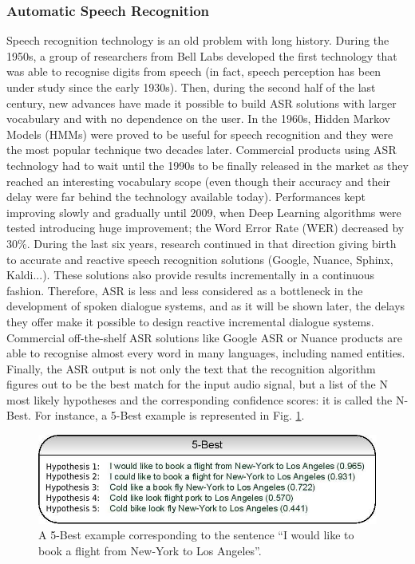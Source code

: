                       \subsubsection{Automatic Speech Recognition}

                      Speech recognition technology is an old problem with long history. During the 1950s, a group of researchers from Bell Labs developed the first technology that was able to recognise digits from speech (in fact, speech perception has been under study since the early 1930s). Then, during the second half of the last century, new advances have made it possible to build ASR solutions with larger vocabulary and with no dependence on the user. In the 1960s, Hidden Markov Models (HMMs) were proved to be useful for speech recognition \cite{Gales2007} and they were the most popular technique two decades later. Commercial products using ASR technology had to wait until the 1990s to be finally released in the market as they reached an interesting vocabulary scope (even though their accuracy and their delay were far behind the technology available today). Performances kept improving slowly and gradually until 2009, when Deep Learning algorithms were tested \cite{Mohamed2009,Deng2013} introducing huge improvement; the Word Error Rate (WER) decreased by 30\%. During the last six years, research continued in that direction giving birth to accurate and reactive speech recognition solutions (Google, Nuance, Sphinx, Kaldi...). These solutions also provide results incrementally in a continuous fashion. Therefore, ASR is less and less considered as a bottleneck in the development of spoken dialogue systems, and as it will be shown later, the delays they offer make it possible to design reactive incremental dialogue systems. Commercial off-the-shelf ASR solutions like Google ASR or Nuance products are able to recognise almost every word in many languages, including named entities. Finally, the ASR output is not only the text that the recognition algorithm figures out to be the best match for the input audio signal, but a list of the N most likely hypotheses and the corresponding confidence scores: it is called the N-Best. For instance, a 5-Best example is represented in Fig. \ref{fig:fivebest}.
                      
                      \begin{figure}
                        \centering
                        \includegraphics[scale=1]{figures/5BestEx.jpg}
                        \caption{A 5-Best example corresponding to the sentence ``I would like to book a flight from New-York to Los Angeles''.}
                        \label{fig:fivebest}
                        \end{figure}
                        
